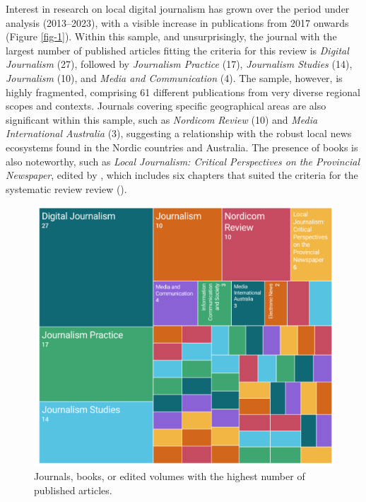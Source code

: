 \documentclass[english]{textolivre}
\begin{document}
Interest in research on local digital journalism has grown over the period under analysis (2013–2023), with a visible increase in publications from 2017 onwards (Figure \ref{fig-1}). Within this sample, and unsurprisingly, the journal with the largest number of published articles fitting the criteria for this review is \emph{Digital Journalism} (27), followed by \emph{Journalism Practice} (17), \emph{Journalism Studies} (14), \emph{Journalism} (10), and \emph{Media and Communication} (4). The sample, however, is highly fragmented, comprising 61 different publications from very diverse regional scopes and contexts. Journals covering specific geographical areas are also significant within this sample, such as \emph{Nordicom Review} (10) and \emph{Media International Australia} (3), suggesting a relationship with the robust local news ecosystems found in the Nordic countries and Australia. The presence of books is also noteworthy, such as \emph{Local Journalism: Critical Perspectives on the Provincial Newspaper}, edited by \textcite{matthews2023}, which includes six chapters that suited the criteria for the systematic review review ().

\begin{figure}[htbp]
\centering
\begin{minipage}{0.70\textwidth}
\includegraphics[width =\textwidth]{Imagens/Fig2.png}
\caption{Journals, books, or edited volumes with the highest number of published articles.}
\label{fig-2}
\end{minipage}
\end{figure}
\end{document}

